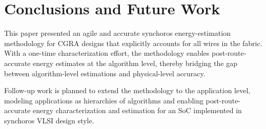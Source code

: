 \section{Conclusions and Future Work}
This paper presented an agile and accurate synchoros energy-estimation methodology for CGRA designs that explicitly accounts for all wires in the fabric. 
With a one-time characterization effort, the methodology enables post-route-accurate energy estimates at the algorithm level, thereby bridging the gap between algorithm-level estimations and physical-level accuracy.

Follow-up work is planned to extend the methodology to the application level, modeling applications as hierarchies of algorithms and enabling post-route-accurate energy characterization and estimation for an SoC implemented in synchoros VLSI design style.
 